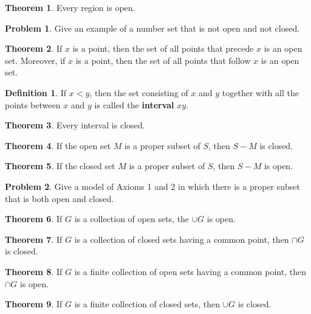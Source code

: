 \documentclass{article}
\theoremstyle{definition}
\newtheorem{definition}{Definition}
\newtheorem{theorem}{Theorem}
\theoremstyle{definition}
\newtheorem{problem}{Problem}
\theoremstyle{plain}
\begin{document}
\begin{theorem}
  Every region is open.
\end{theorem}

\begin{problem}
  Give an example of a number set that is not open and not closed.
\end{problem}

\begin{theorem}
  If $x$ is a point, then the set of all points that precede $x$ is an open
  set.  Moreover, if $x$ is a point, then the set of all points that follow $x$
  is an open set.
\end{theorem}

\begin{definition}
  If $x < y$, then the set consisting of $x$ and $y$ together with all the
  points between $x$ and $y$ is called the \textbf{interval} $xy$.
\end{definition}

\begin{theorem}
  Every interval is closed.
\end{theorem}

\begin{theorem}
  If the open set $M$ is a proper subset of $S$, then $S -
  M$ is closed.
\end{theorem}

\begin{theorem}
  If the closed set $M$ is a proper subset of $S$, then $S
  - M$ is open.
\end{theorem}

\begin{problem}
  Give a model of Axioms 1 and 2 in which there is a proper subset that is both
  open and closed.
\end{problem}

\begin{theorem}
  If $G$ is a collection of open sets, the $\cup G$ is open.
\end{theorem}

\begin{theorem}
  If $G$ is a collection of closed sets having a common point, then $\cap G$ is
  closed.
\end{theorem}

\begin{theorem}
  If $G$ is a finite collection of open sets having a common point, then $\cap
  G$ is open.
\end{theorem}

\begin{theorem}
  If $G$ is a finite collection of closed sets, then $\cup G$ is closed.
\end{theorem}
\end{document}
